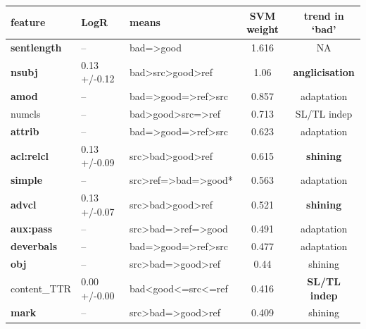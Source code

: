 

\begin{longtable}{l|llcc}
		\midrule
		feature      & LogR         & means            & SVM weight &  trend in `bad' \\
		\midrule
		\textbf{sentlength}   & --           & bad=>good & 1.616 & NA  \\
		\textbf{nsubj}        & 0.13 +/-0.12 & bad>src>good>ref & 1.06  & \textbf{anglicisation} \\
		\textbf{amod}         & --           & bad=>good=>ref>src & 0.857 & adaptation \\
		\textcolor{Dandelion}{numcls}       & -- & bad>good>src=>ref & 0.713 & SL/TL indep \\
		\textbf{attrib}       & --           & bad=>good=>ref>src & 0.623 & adaptation \\
		\textbf{acl:relcl}    & 0.13 +/-0.09 & src>bad>good>ref & 0.615 & \textbf{shining} \\
		\textbf{simple}       & --           & src>ref=>bad=>good* & 0.563 & adaptation \\
		\textbf{advcl}        & 0.13 +/-0.07 & src>bad>good>ref & 0.521 & \textbf{shining} \\
		\textbf{aux:pass}     & --           & src>bad=>ref=>good & 0.491 & adaptation \\
		\textbf{deverbals}    & --           & bad=>good=>ref>src & 0.477 & adaptation \\
		\textbf{obj}          & --           & src>bad=>good>ref & 0.44  & shining \\
		\textcolor{cadmiumgreen}{content\_TTR} & 0.00 +/-0.00 & bad<good<=src<=ref & 0.416 & \textbf{SL/TL indep} \\
		\textbf{mark}         & --           & src>bad=>good>ref & 0.409 & shining \\

\end{longtable}

